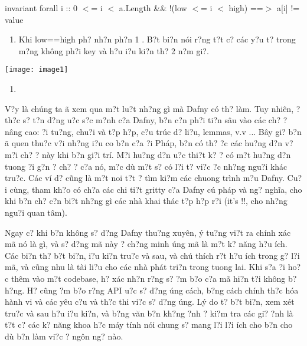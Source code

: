 \documentclass{article} %
\begin{document}
\noindent  invariant forall i ::               0 $<$= i $<$ a.Length \&\& !(low $<$= i $<$ high) ==$>$ a[i] != value

\begin{enumerate}
\item  Khi low==high ph? nh?n ph?n 1 . B?t bi?n n\'{o}i r?ng t?t c? c\'{a}c y?u t? trong m?ng kh\^{o}ng ph?i key v\`{a} h?u {\dj}i?u ki?n th? 2 n?m gi?.
\end{enumerate}

\noindent \texttt{[image: image1]}

\begin{enumerate}
\item  {}
\end{enumerate}

V?y l\`{a} ch\'{u}ng ta {\dj}\~{a} xem qua m?t lu?t nh?ng g\`{i} m\`{a} Dafny c\'{o} th? l\`{a}m. Tuy nhi\^{e}n, {\dj}? th?c s? t?n d?ng {\dj}u?c s?c m?nh c?a Dafny, b?n c?n ph?i ti?n s\^{a}u v\`{a}o c\'{a}c ch? {\dj}? n\^{a}ng cao: {\dj}?i tu?ng, chu?i v\`{a} t?p h?p, c?u tr\'{u}c d? li?u, lemmas, v.v ... B\^{a}y gi? b?n {\dj}\~{a} quen thu?c v?i nh?ng {\dj}i?u co b?n c?a {\DJ}?i Ph\'{a}p, b?n c\'{o} th? {\dj}?c c\'{a}c hu?ng d?n v? m?i ch? {\dj}? n\`{a}y khi b?n gi?i tr\'{i}. M?i hu?ng d?n {\dj}u?c thi?t k? {\dj}? c\'{o} m?t hu?ng d?n tuong {\dj}?i g?n {\dj}? ch? {\dj}? c?a n\'{o}, m?c d\`{u} m?t s? c\'{o} l?i t? vi?c {\dj}?c nh?ng ngu?i kh\'{a}c tru?c. C\'{a}c v\'{i} d? c\~{u}ng l\`{a} m?t noi t?t {\dj}? t\`{i}m ki?m c\'{a}c chuong tr\`{i}nh m?u Dafny. Cu?i c\`{u}ng, tham kh?o c\'{o} ch?a c\'{a}c chi ti?t gritty c?a Dafny c\'{u} ph\'{a}p v\`{a} ng? ngh\~{i}a, cho khi b?n ch? c?n bi?t nh?ng g\`{i} c\'{a}c nh\`{a} khai th\'{a}c t?p h?p r?i (it's !!, cho nh?ng ngu?i quan t\^{a}m).\underbar{}

Ngay c? khi b?n kh\^{o}ng s? d?ng Dafny thu?ng xuy\^{e}n, \'{y} tu?ng vi?t ra ch\'{i}nh x\'{a}c m\~{a} n\'{o} l\`{a} g\`{i}, v\`{a} s? d?ng m\~{a} n\`{a}y {\dj}? ch?ng minh {\dj}\'{u}ng m\~{a} l\`{a} m?t k? n\u{a}ng h?u \'{i}ch. C\'{a}c bi?n th? b?t bi?n, {\dj}i?u ki?n tru?c v\`{a} sau, v\`{a} ch\'{u} th\'{i}ch r?t h?u \'{i}ch trong g? l?i m\~{a}, v\`{a} c\~{u}ng nhu l\`{a} t\`{a}i li?u cho c\'{a}c nh\`{a} ph\'{a}t tri?n trong tuong lai. Khi s?a {\dj}?i ho?c th\^{e}m v\`{a}o m?t codebase, h? x\'{a}c nh?n r?ng s? {\dj}?m b?o c?a m\~{a} hi?n t?i kh\^{o}ng b? h?ng. H? c\~{u}ng {\dj}?m b?o r?ng API {\dj}u?c s? d?ng {\dj}\'{u}ng c\'{a}ch, b?ng c\'{a}ch ch\'{i}nh th?c h\'{o}a h\`{a}nh vi v\`{a} c\'{a}c y\^{e}u c?u v\`{a} th?c thi vi?c s? d?ng {\dj}\'{u}ng. L\'{y} do t? b?t bi?n, xem x\'{e}t tru?c v\`{a} sau h?u {\dj}i?u ki?n, v\`{a} b?ng v\u{a}n b?n kh?ng {\dj}?nh {\dj}? ki?m tra c\'{a}c gi? {\dj}?nh l\`{a} t?t c? c\'{a}c k? n\u{a}ng khoa h?c m\'{a}y t\'{i}nh n\'{o}i chung s? mang l?i l?i \'{i}ch cho b?n cho d\`{u} b?n l\`{a}m vi?c ? ng\^{o}n ng? n\`{a}o.
\end{document}
